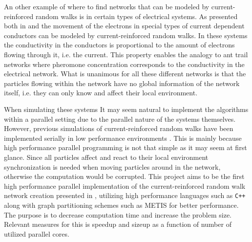 An other example of where to find networks that can be modeled by current-reinforced random walks is in certain types of electrical systems. As presented both in \cite{Sumpter} and \cite{Doyle} the movement of the electrons in special types of current dependent conductors can be modeled by current-reinforced random walks. In these systems the conductivity in the conductors is proportional to the amount of electrons flowing through it, i.e. the current. This property enables the analogy to ant trail networks where pheromone concentration corresponds to the conductivity in the electrical network. What is unanimous for all these different networks is that the particles flowing within the network have no global information of the network itself, i.e. they can only know and affect their local environment. 

When simulating these systems It may seem natural to implement the algorithms within a parallel setting due to the parallel nature of the systems themselves. However, previous simulations of current-reinforced random walks have been implemented serially in low performance environments \cite{Sumpter, Ma2012rib}. This is mainly because high performance parallel programming is not that simple as it may seem at first glance. Since all particles affect and react to their local environment synchronization is needed when moving particles around in the network, otherwise the computation would be corrupted. This project aims to be the first high performance parallel implementation of the current-reinforced random walk network creation presented in \cite{Sumpter}, utilizing high performance languages such as \texttt{C++} along with graph partitioning schemes such as METIS for better performance. The purpose is to decrease computation time and increase the problem size. Relevant measures for this is speedup and sizeup as a function of number of utilized parallel cores.